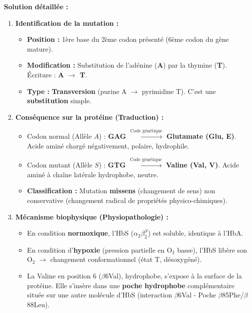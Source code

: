 \documentclass[11pt]{article}
\begin{document}
\begin{exoresolu}
    \tcblower
    \textbf{Solution détaillée :}
    \begin{enumerate}
        \item \textbf{Identification de la mutation :}
              \begin{itemize}
                  \item \textbf{Position :} 1ère base du 2ème codon présenté (6ème codon du gène mature).
                  \item \textbf{Modification :} Substitution de l'adénine (\textbf{A}) par la thymine (\textbf{T}). Écriture : \textbf{A $\rightarrow$ T}.
                  \item \textbf{Type :} \textbf{Transversion} (purine A $\rightarrow$ pyrimidine T). C'est une \textbf{substitution} simple.
              \end{itemize}
        \item \textbf{Conséquence sur la protéine (Traduction) :}
              \begin{itemize}
                  \item Codon normal (Allèle $A$) : \textbf{GAG} $\xrightarrow{\text{Code génétique}}$ \textbf{Glutamate (Glu, E)}. Acide aminé chargé négativement, polaire, hydrophile.
                  \item Codon mutant (Allèle $S$) : \textbf{GTG} $\xrightarrow{\text{Code génétique}}$ \textbf{Valine (Val, V)}. Acide aminé à chaîne latérale hydrophobe, neutre.
                  \item \textbf{Classification :} Mutation \textbf{missens} (changement de sens) non conservative (changement radical de propriétés physico-chimiques).
              \end{itemize}
        \item \textbf{Mécanisme biophysique (Physiopathologie) :}
              \begin{itemize}
                  \item En condition \textbf{normoxique}, l'HbS ($\alpha_2\beta_2^S$) est soluble, identique à l'HbA.
                  \item En condition d'\textbf{hypoxie} (pression partielle en O$_2$ basse), l'HbS libère son O$_2$ $\rightarrow$ changement conformationnel (état T, désoxygéné).
                  \item La Valine en position 6 ($\beta$6Val), hydrophobe, s'expose à la surface de la protéine. Elle s'insère dans une \textbf{poche hydrophobe} complémentaire située sur une autre molécule d'HbS (interaction $\beta$6Val - Poche $\beta$85Phe/$\beta$88Leu).

\end{itemize}
\end{enumerate}
\end{exoresolu}
\end{document}
